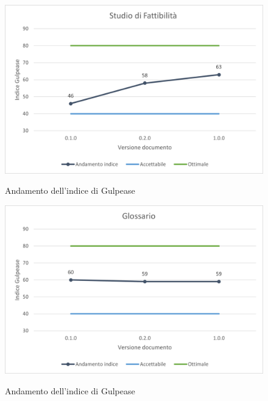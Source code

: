 \begin{figure}[H]
\centering
\includegraphics[scale=0.90]{res/ResocontoAttivitaDiVerifica/res/img/gulpeaseSDF.png}\\
\caption{Andamento dell'indice di Gulpease \SdF}
\end{figure}

\begin{figure}[H]
\centering
\includegraphics[scale=0.90]{res/ResocontoAttivitaDiVerifica/res/img/gulpeaseG.png}\\
\caption{Andamento dell'indice di Gulpease \Glossario}
\end{figure}

